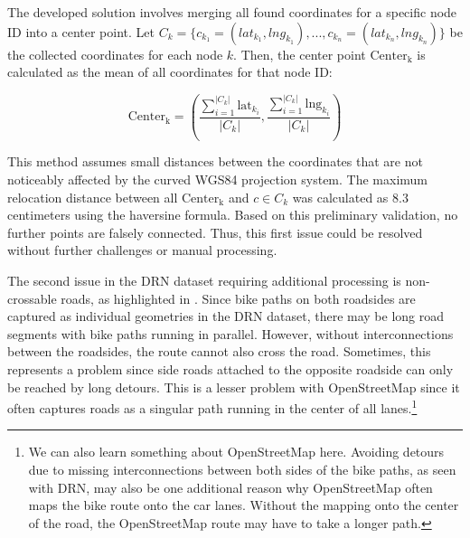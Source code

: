 The developed solution involves merging all found coordinates for a specific node ID into a center point. Let $C_k = \{c_{k_1} = (lat_{k_1}, lng_{k_1}), \text{...} , c_{k_n} = (lat_{k_n}, lng_{k_n})\}$ be the collected coordinates for each node $k$. Then, the center point $\text{Center}_{\text{k}}$ is calculated as the mean of all coordinates for that node ID:

\begin{equation}\text{Center}_{\text{k}} = \left(\frac{\sum_{i=1}^{|C_k|} \text{{lat}}_{k_i}}{|C_k|}, \frac{\sum_{i=1}^{|C_k|} \text{{lng}}_{k_i}}{|C_k|}\right)\end{equation}

This method assumes small distances between the coordinates that are not noticeably affected by the curved WGS84 projection system. The maximum relocation distance between all $\text{Center}_{\text{k}}$ and $c \in C_k$ was calculated as 8.3 centimeters using the haversine formula. Based on this preliminary validation, no further points are falsely connected. Thus, this first issue could be resolved without further challenges or manual processing.

The second issue in the DRN dataset requiring additional processing is non-crossable roads, as highlighted in . Since bike paths on both roadsides are captured as individual geometries in the DRN dataset, there may be long road segments with bike paths running in parallel. However, without interconnections between the roadsides, the route cannot also cross the road. Sometimes, this represents a problem since side roads attached to the opposite roadside can only be reached by long detours. This is a lesser problem with OpenStreetMap since it often captures roads as a singular path running in the center of all lanes.\footnote{We can also learn something about OpenStreetMap here. Avoiding detours due to missing interconnections between both sides of the bike paths, as seen with DRN, may also be one additional reason why OpenStreetMap often maps the bike route onto the car lanes. Without the mapping onto the center of the road, the OpenStreetMap route may have to take a longer path.}

